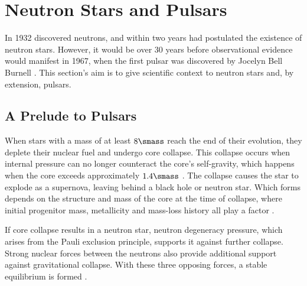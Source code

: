 
\section{Neutron Stars and Pulsars}

In 1932 \citeauthor{chadwick_existence_1932} discovered neutrons, and within two years \cite{baade_cosmic_nodate} had postulated the existence of neutron stars. However, it would be over 30 years before observational evidence would manifest in 1967, when the first pulsar was discovered by Jocelyn Bell Burnell \citep{hewish_observation_1968}. This section's aim is to give scientific context to neutron stars and, by extension, pulsars. 

\subsection{A Prelude to Pulsars}

When stars with a mass of at least $8 \smass$ reach the end of their evolution, they deplete their nuclear fuel and undergo core collapse. This collapse occurs when internal pressure can no longer counteract the core's self-gravity, which happens when the core exceeds approximately $1.4 \smass$ \citep[pp. 434 -- 443,][]{chandrasekhar_introduction_2012}.  The collapse causes the star to explode as a supernova, leaving behind a black hole or neutron star. Which forms depends on the structure and mass of the core at the time of collapse, where initial progenitor mass, metallicity and mass-loss history all play a factor \citep{heger_how_2003}. \

If core collapse results in a neutron star, neutron degeneracy pressure, which arises from the Pauli exclusion principle, supports it against further collapse. Strong nuclear forces between the neutrons also provide additional support against gravitational collapse. With these three opposing forces, a stable equilibrium is formed \citep[pp. 1--6,][]{1983bhwd.book.....S}. \

